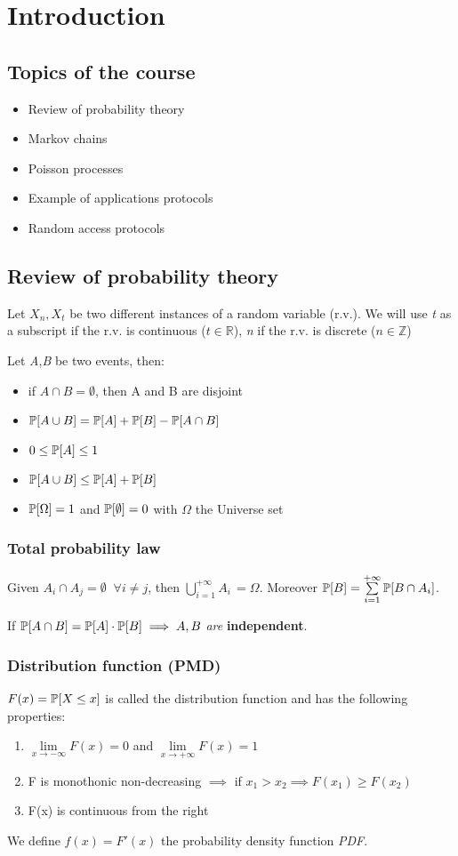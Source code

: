 \chapter{Introduction}
\section{Topics of the course}
\begin{itemize}
  \item Review of probability theory
  \item Markov chains
  \item Poisson processes
  \item Example of applications protocols
  \item Random access protocols
\end{itemize}
\section{Review of probability theory}
Let $X_n, X_t$ be two different instances of a random variable (r.v.). We will use
\textit{t} as a subscript if the r.v. is continuous ($t \in \mathbb{R}$), \textit{n} if the r.v. is discrete ($ n \in \mathbb{Z}$)

Let \textit{A},\textit{B} be two events, then:
\begin{itemize}
  \item if $A \cap B = \emptyset$, then A and B are disjoint
  \item $\mathbb{P}[A \cup B] = \mathbb{P}[A]+\mathbb{P}[B] - \mathbb{P}[A \cap B]$
  \item $0\le \mathbb{P}[A] \le 1$
  \item $\mathbb{P}[A \cup B] \le \mathbb{P}[A]+\mathbb{P}[B]$
  \item $ \mathbb{P}[\Omega]=1 $ and $\mathbb{P}[\emptyset]=0$ with $\Omega$ the Universe set
\end{itemize}
\subsection{Total probability law}
Given $A_i \cap A_j = \emptyset \;\; \forall i \neq j $, then $\bigcup\limits_{i=1}^{+\infty} A_i \, = \Omega$.
Moreover $\mathbb{P}[B]=\sum\limits_{i=1}^{+\infty} \mathbb{P}[B \cap A_i]$.

If $\mathbb{P}[A \cap B] = \mathbb{P}[A]\cdot \mathbb{P}[B] \implies A,B$ \textit{are} \textbf{independent}.

\subsection{Distribution function (PMD)}\label{sec:pmd}
$F(x) = \mathbb{P}[X \le x]$ is called the distribution function and has the following properties:
\begin{enumerate}
  \item $\lim\limits_{x \to -\infty} F(x) = 0$ \quad and \quad $\lim\limits_{x \to +\infty} F(x) = 1$
  \item F is monothonic non-decreasing $\implies$ if $x_1 > x_2 \implies F(x_1)\ge F(x_2)$
  \item F(x) is continuous from the right
\end{enumerate}
We define $f(x)=F'(x)$ the probability density function \textit{PDF}.

